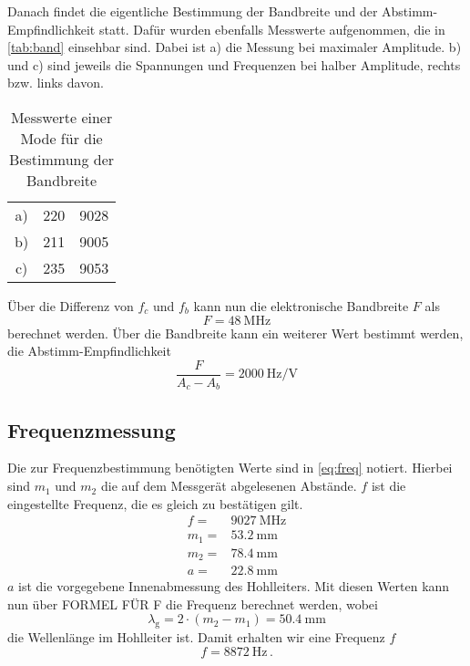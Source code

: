 Danach findet die eigentliche Bestimmung der Bandbreite und der Abstimm-Empfindlichkeit statt.
Dafür wurden ebenfalls Messwerte aufgenommen, die in \autoref{tab:band} einsehbar sind.
Dabei ist a) die Messung bei maximaler Amplitude.
b) und c) sind jeweils die Spannungen und Frequenzen bei halber Amplitude, rechts bzw. links davon.

\begin{table}
    \centering
    \caption{Messwerte einer Mode für die Bestimmung der Bandbreite}
    \label{tab:band}
    \begin{tabular}{c S[table-format=3.0] S[table-format=4.0]}
        \toprule
         &  &  \\
        \midrule
        a) & 220 & 9028 \\
        b) & 211 & 9005 \\
        c) & 235 & 9053 \\
        \bottomrule
    \end{tabular}
\end{table}

Über die Differenz von $f_c$ und $f_b$ kann nun die elektronische Bandbreite $F$ als 
\begin{equation}
    F = \SI{48}{\mega\hertz}
    \label{eq:bandbreite}
\end{equation}
berechnet werden.
Über die Bandbreite kann ein weiterer Wert bestimmt werden, die Abstimm-Empfindlichkeit
\begin{equation}
    \frac{F}{A_c - A_b} = \SI{2000}{\hertz\per\volt}
    \label{eq:abstimm}
\end{equation}

\subsection{Frequenzmessung}
\label{ssec:a2}

Die zur Frequenzbestimmung benötigten Werte sind in \autoref{eq:freq} notiert.
Hierbei sind $m_1$ und $m_2$ die auf dem Messgerät abgelesenen Abstände.
$f$ ist die eingestellte Frequenz, die es gleich zu bestätigen gilt.
\begin{align}
    f =& \SI{9027}{\mega\hertz} \\
    m_1 =& \SI{53.2}{\milli\meter} \\
    m_2 =& \SI{78.4}{\milli\meter} \\
    a =& \SI{22.8}{\milli\meter}
    \label{eq:freq}
\end{align}
$a$ ist die vorgegebene Innenabmessung des Hohlleiters.
Mit diesen Werten kann nun über FORMEL FÜR F die Frequenz berechnet werden, wobei 
\begin{equation}
    \lambda _\text{g} = 2 \cdot (m_2 - m_1)= \SI{50.4}{\milli\meter}
    \label{eq:welle}
\end{equation}
die Wellenlänge im Hohlleiter ist.
Damit erhalten wir eine Frequenz $f$
\begin{equation}
    f = \SI{8872}{\hertz} \, .
    \label{eq:frequenz}
\end{equation}

